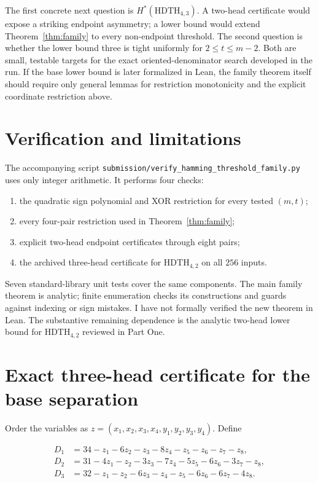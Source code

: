 \documentclass[10pt]{article}
\theoremstyle{definition}
\theoremstyle{remark}
\newcommand{\Hstar}{H^{\ast}}
\newcommand{\HDTH}{\mathrm{HDTH}}
\begin{document}
The first concrete next question is $\Hstar(\HDTH_{4,3})$. A two-head certificate would
expose a striking endpoint asymmetry; a lower bound would extend Theorem~\ref{thm:family}
to every non-endpoint threshold. The second question is whether the lower bound three is
tight uniformly for $2\leq t\leq m-2$. Both are small, testable targets for the exact
oriented-denominator search developed in the run. If the base lower bound is later
formalized in Lean, the family theorem itself should require only general lemmas for
restriction monotonicity and the explicit coordinate restriction above.

\section{Verification and limitations}

The accompanying script \texttt{submission/verify\_hamming\_threshold\_family.py}
uses only integer arithmetic. It performs four checks:

\begin{enumerate}
\item the quadratic sign polynomial and XOR restriction for every tested $(m,t)$;
\item every four-pair restriction used in Theorem~\ref{thm:family};
\item explicit two-head endpoint certificates through eight pairs;
\item the archived three-head certificate for $\HDTH_{4,2}$ on all $256$ inputs.
\end{enumerate}

Seven standard-library unit tests cover the same components. The main family theorem is
analytic; finite enumeration checks its constructions and guards against indexing or
sign mistakes. I have not formally verified the new theorem in Lean. The substantive
remaining dependence is the analytic two-head lower bound for $\HDTH_{4,2}$ reviewed in
Part One.

\clearpage
\appendix

\section{Exact three-head certificate for the base separation}\label{app:certificate}

Order the variables as
$z=(x_1,x_2,x_3,x_4,y_1,y_2,y_3,y_4)$. Define

\begin{align*}
D_1&=34-z_1-6z_2-z_3-8z_4-z_5-z_6-z_7-z_8,\\
D_2&=31-4z_1-z_2-3z_3-7z_4-5z_5-6z_6-3z_7-z_8,\\
D_3&=32-z_1-z_2-6z_3-z_4-z_5-6z_6-6z_7-4z_8.
\end{align*}
\end{document}
